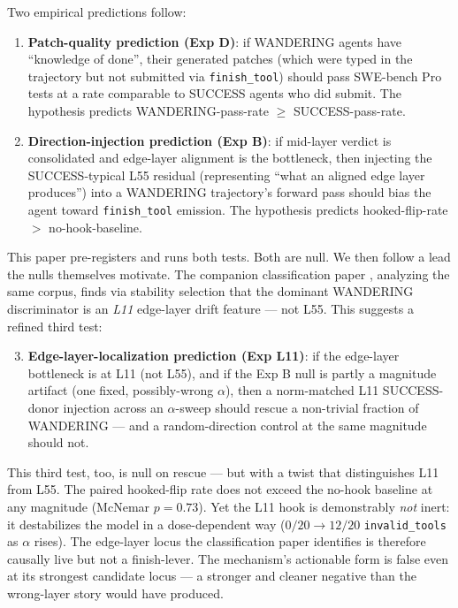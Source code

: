 \documentclass[11pt]{article}
\begin{document}
Two empirical predictions follow:

\begin{enumerate}
\item \textbf{Patch-quality prediction (Exp D)}: if WANDERING agents have ``knowledge of done'', their generated patches (which were typed in the trajectory but not submitted via \texttt{finish\_tool}) should pass SWE-bench Pro tests at a rate comparable to SUCCESS agents who did submit. The hypothesis predicts WANDERING-pass-rate $\geq$ SUCCESS-pass-rate.

\item \textbf{Direction-injection prediction (Exp B)}: if mid-layer verdict is consolidated and edge-layer alignment is the bottleneck, then injecting the SUCCESS-typical L55 residual (representing ``what an aligned edge layer produces'') into a WANDERING trajectory's forward pass should bias the agent toward \texttt{finish\_tool} emission. The hypothesis predicts hooked-flip-rate $>$ no-hook-baseline.
\end{enumerate}

This paper pre-registers and runs both tests. Both are null. We then follow a lead the nulls themselves motivate. The companion classification paper \cite{multichannel_2026}, analyzing the same corpus, finds via stability selection that the dominant WANDERING discriminator is an \emph{L11} edge-layer drift feature --- not L55. This suggests a refined third test:

\begin{enumerate}
\setcounter{enumi}{2}
\item \textbf{Edge-layer-localization prediction (Exp L11)}: if the edge-layer bottleneck is at L11 (not L55), and if the Exp B null is partly a magnitude artifact (one fixed, possibly-wrong $\alpha$), then a norm-matched L11 SUCCESS-donor injection across an $\alpha$-sweep should rescue a non-trivial fraction of WANDERING --- and a random-direction control at the same magnitude should not.
\end{enumerate}

This third test, too, is null on rescue --- but with a twist that distinguishes L11 from L55. The paired hooked-flip rate does not exceed the no-hook baseline at any magnitude (McNemar $p=0.73$). Yet the L11 hook is demonstrably \emph{not} inert: it destabilizes the model in a dose-dependent way ($0/20 \to 12/20$ \texttt{invalid\_tools} as $\alpha$ rises). The edge-layer locus the classification paper identifies is therefore causally live but not a finish-lever. The mechanism's actionable form is false even at its strongest candidate locus --- a stronger and cleaner negative than the wrong-layer story would have produced.
\end{document}

